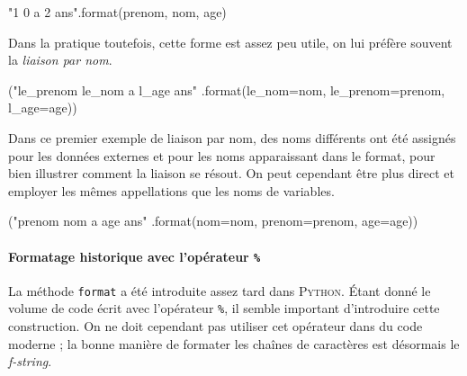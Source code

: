 \begin{idleconsole}
	\begin{pyconsole}
		"{1} {0} a {2} ans".format(prenom, nom, age)
	\end{pyconsole}
\end{idleconsole}

Dans la pratique toutefois, cette forme est assez peu utile, on lui préfère souvent la \emph{liaison par nom}.

\begin{idleconsole}
\begin{pyconsole}
("{le_prenom} {le_nom} a {l_age} ans"
.format(le_nom=nom, le_prenom=prenom, l_age=age))
\end{pyconsole}
\end{idleconsole}

Dans ce premier exemple de liaison par nom, des noms différents ont été assignés pour les données externes et pour les noms apparaissant dans le format, pour bien illustrer comment la liaison se résout. %
On peut cependant être plus direct et employer les mêmes appellations que les noms de variables.

\begin{idleconsole}
\begin{pyconsole}
("{prenom} {nom} a {age} ans"
.format(nom=nom, prenom=prenom, age=age))
\end{pyconsole}
\end{idleconsole}

\vspace{-0.5pt}

\paragraph{Formatage historique avec l'opérateur {\normalfont\texttt{\%}}}
La méthode \texttt{format} a été introduite assez tard dans \textsc{Python}. %
Étant donné le volume de code écrit avec l'opérateur \texttt{\%}, \nopagebreak il semble important d'introduire cette construction. On ne doit cependant pas utiliser cet opérateur dans du code moderne ; la bonne manière de formater les chaînes de caractères est désormais le \textit{f-string}.

